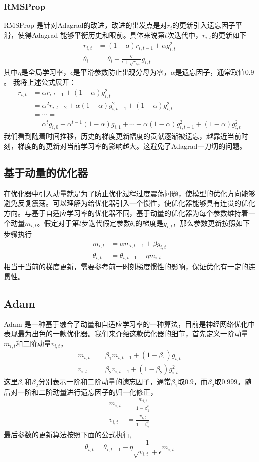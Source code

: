 \documentclass[twoside,a4paper,12pt]{book}%
\begin{document}
\subsubsection{RMSProp}
RMSProp 是针对Adagrad的改进，改进的出发点是对$r_i$的更新引入遗忘因子平滑，使得Adagrad 能够平衡历史和眼前。具体来说第$t$次迭代中，$r_{i,t}$的更新如下
$$
\begin{aligned}
r_{i,t}&=(1-\alpha)r_{i,t-1}+\alpha g_{i,t}^2\\
\theta_i &= \theta_i-\frac{\eta}{\epsilon + \sqrt{r_{i,t}}}g_{i,t}
\end{aligned}
$$
其中$\eta$是全局学习率，$\epsilon$是平滑参数防止出现分母为零，$\alpha$是遗忘因子，通常取值$0.9$。
我将上述公式展开：
$$
\begin{aligned}
r_{i,t}&=\alpha r_{i,t-1}+(1-\alpha) g_{i,t}^2\\
       &=\alpha^2r_{i,t-2}+\alpha (1-\alpha ) g_{i,t-1}^2+(1-\alpha) g_{i,t}^2 \\
       &=\cdots=\\
       &=\alpha^t g_{i,0} +  \alpha^{t-1} (1-\alpha ) g_{i,1} + \cdots + \alpha (1-\alpha ) g_{i,t-1}^2+(1-\alpha) g_{i,t}^2
\end{aligned}
$$
我们看到随着时间推移，历史的梯度更新幅度的贡献逐渐被遗忘，越靠近当前时刻，梯度的的更新对当前学习率的影响越大。这避免了Adagrad一刀切的问题。

\subsection{基于动量的优化器}
在优化器中引入动量就是为了防止优化过程过度震荡问题，使模型的优化方向能够避免反复震荡。可以理解为给优化器引入一个惯性，使优化器能够具有连贯的优化方向。与基于自适应学习率的优化器不同，基于动量的优化器为每个参数维持着一个动量$m_{i,t}$。假定对于第$t$步迭代假定参数$\theta_i$的梯度是$g_{i,t}$，那么参数更新按照如下步骤执行
$$
\begin{aligned}
m_{i,t}&=\alpha m_{i,t-1} + \beta g_{i,t} \\
\theta_{i,t} &= \theta_{i,t-1} - \eta m_{i,t}
\end{aligned}
$$
相当于当前的梯度更新，需要参考前一时刻梯度惯性的影响，保证优化有一定的连贯性。
\subsection{Adam}
Adam 是一种基于融合了动量和自适应学习率的一种算法，目前是神经网络优化中表现最为出色的一款优化器。我们来介绍这款优化器的细节，首先定义一阶动量$m_{i,t}$和二阶动量$v_{i,t}$，
$$
\begin{aligned}
m_{i,t}&=\beta_1 m_{i,t-1} +(1-\beta_1)g_{i,t} \\
v_{i,t}&=\beta_2 v_{i,t-1} +(1-\beta_2)g_{i,t}^2
\end{aligned}
$$
这里$\beta_1$和$\beta_2$分别表示一阶和二阶动量的遗忘因子，通常$\beta_1$取$0.9$，而$\beta_2$取$0.999$。随后对一阶和二阶动量进行遗忘因子的归一化修正，
$$
\begin{aligned}
m_{i,t}&=\frac{m_{i,t}}{1-\beta_1^t} \\
v_{i,t}&=\frac{v_{i,t}}{1-\beta_2^t}
\end{aligned}
$$
最后参数的更新算法按照下面的公式执行,
$$
\theta_{i,t}  =\theta_{i,t-1} -\eta \frac{1}{\sqrt{v_{i,t}}+\epsilon  } m_{i,t} 
$$
\end{document}
